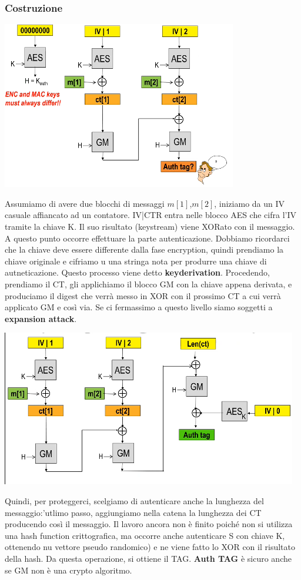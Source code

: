 \documentclass{book}
\theoremstyle{remark}
\begin{document}
\subsubsection*{Costruzione}
\begin{center}
	\includegraphics*[scale=0.8]{2021-11-21-22-03-58.png}
\end{center}
Assumiamo di avere due blocchi di messaggi \(m[1]\),\(m[2]\), iniziamo da un IV casuale affiancato ad un contatore\@. IV|CTR entra nelle blocco
AES che cifra l'IV tramite la chiave K\@. Il suo risultato (keystream) viene XORato con il messaggio\@. A questo punto occorre effettuare la parte
autenticazione\@. Dobbiamo ricordarci che la chiave deve essere differente dalla fase encryption, quindi prendiamo la chiave originale e cifriamo u
una stringa nota per produrre una chiave di autneticazione\@. Questo processo viene detto \textbf{keyderivation}\@.\newline
Procedendo, prendiamo il CT, gli applichiamo il blocco GM con la chiave appena derivata, e produciamo il digest che verrà messo in XOR con il
prossimo CT a cui verrà applicato GM e così via\@. Se ci fermassimo a questo livello siamo soggetti a \textbf{expansion attack}\@.
\begin{center}
	\includegraphics*[scale=0.8]{2021-11-21-22-05-03.png}
\end{center}
Quindi, per proteggerci, scelgiamo di autenticare anche la lunghezza del messaggio:\@all'utlimo passo, aggiungiamo nella catena la lunghezza dei CT
producendo così il messaggio\@. Il lavoro ancora non è finito poiché non si utilizza una hash function crittografica, ma occorre anche autenticare
S con chiave K, ottenendo nu vettore pseudo randomico) e ne viene fatto lo XOR con il risultato della hash\@. Da questa operazione, si ottiene il TAG\@.
\textbf{Auth TAG} è sicuro anche se GM non è una crypto algoritmo\@.
\end{document}
